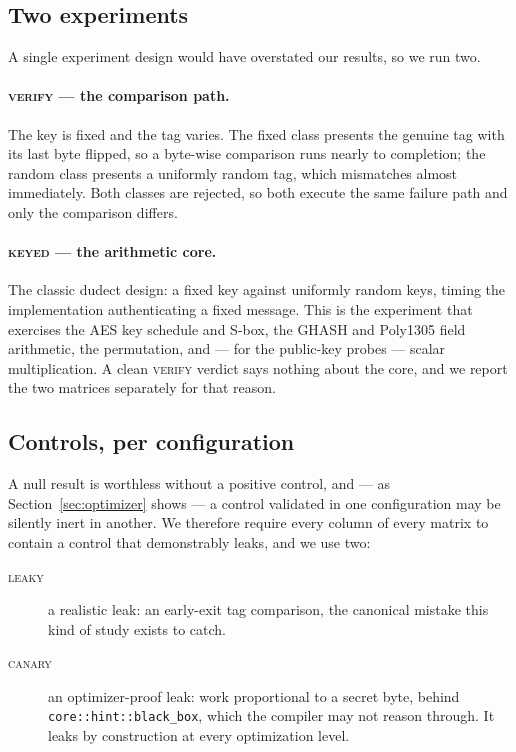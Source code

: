 \documentclass[11pt,a4paper]{article}
\begin{document}
\subsection{Two experiments}
\label{sec:experiments}
A single experiment design would have overstated our results, so we run two.

\paragraph{\textsc{verify} --- the comparison path.}
The key is fixed and the tag varies. The fixed class presents the genuine tag
with its last byte flipped, so a byte-wise comparison runs nearly to completion;
the random class presents a uniformly random tag, which mismatches almost
immediately. Both classes are rejected, so both execute the same failure path
and only the comparison differs.

\paragraph{\textsc{keyed} --- the arithmetic core.}
The classic dudect design: a fixed key against uniformly random keys, timing the
implementation authenticating a fixed message. This is the experiment that
exercises the AES key schedule and S-box, the GHASH and Poly1305 field
arithmetic, the permutation, and --- for the public-key probes --- scalar
multiplication. A clean \textsc{verify} verdict says nothing about the core, and
we report the two matrices separately for that reason.

\subsection{Controls, per configuration}
\label{sec:controls}
A null result is worthless without a positive control, and --- as
Section~\ref{sec:optimizer} shows --- a control validated in one configuration
may be silently inert in another. We therefore require every column of every
matrix to contain a control that demonstrably leaks, and we use two:

\begin{description}
  \item[\textsc{leaky}] a realistic leak: an early-exit tag comparison, the
        canonical mistake this kind of study exists to catch.
  \item[\textsc{canary}] an optimizer-proof leak: work proportional to a secret
        byte, behind \texttt{core::hint::black\_box}, which the compiler may not
        reason through. It leaks by construction at every optimization level.
\end{description}
\end{document}
